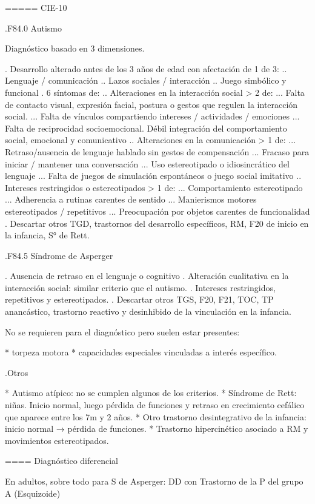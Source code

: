 \documentclass[encares.tex]{subfiles}
\begin{document}
===== CIE-10

.F84.0 Autismo

Diagnóstico basado en 3 dimensiones.

. Desarrollo alterado antes de los 3 años de edad con afectación de 1 de 3:
.. Lenguaje / comunicación
.. Lazos sociales / interacción
.. Juego simbólico y funcional
. 6 síntomas de:
.. Alteraciones en la interacción social > 2 de:
... Falta de contacto visual, expresión facial, postura o gestos que regulen la interacción social.
... Falta de vínculos compartiendo intereses / actividades / emociones
... Falta de reciprocidad socioemocional. Débil integración del comportamiento social, emocional y comunicativo
.. Alteraciones en la comunicación > 1 de:
... Retraso/ausencia de lenguaje hablado sin gestos de compensación
... Fracaso para iniciar / mantener una conversación
... Uso estereotipado o idiosincrático del lenguaje
... Falta de juegos de simulación espontáneos o juego social imitativo
.. Intereses restringidos o estereotipados > 1 de:
... Comportamiento estereotipado
... Adherencia a rutinas carentes de sentido
... Manierismos motores estereotipados / repetitivos
... Preocupación por objetos carentes de funcionalidad
. Descartar otros TGD, trastornos del desarrollo específicos, RM, F20 de inicio en la infancia, S° de Rett.

.F84.5 Síndrome de Asperger

. Ausencia de retraso en el lenguaje o cognitivo
. Alteración cualitativa en la interacción social: similar criterio que el autismo.
. Intereses restringidos, repetitivos y estereotipados.
. Descartar otros TGS, F20, F21, TOC, TP anancástico, trastorno reactivo y desinhibido de la vinculación en la infancia.

No se requieren para el diagnóstico pero suelen estar presentes:

* torpeza motora
* capacidades especiales vinculadas a interés específico.

.Otros

* Autismo atípico: no se cumplen algunos de los criterios.
* Síndrome de Rett: niñas. Inicio normal, luego pérdida de funciones y retraso en crecimiento cefálico que aparece entre los 7m y 2 años.
* Otro trastorno desintegrativo de la infancia: inicio normal → pérdida de funciones.
* Trastorno hipercinético asociado a RM y movimientos estereotipados.


==== Diagnóstico diferencial

En adultos, sobre todo para S de Asperger: DD con Trastorno de la P del grupo A (Esquizoide)
\end{document}

